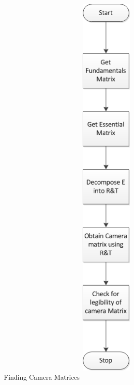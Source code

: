 \pagebreak
\begin{figure} [ht] 
    \centering
    \begin{minipage}[b]{0.45\linewidth}
    \centering
    \includegraphics[width=20cm,height=20cm,keepaspectratio]{Pictures/FCM.png}
    \caption{Finding Camera Matrices}
    \label{fig:motionM}
    \end{minipage}
\end{figure}
\pagebreak
